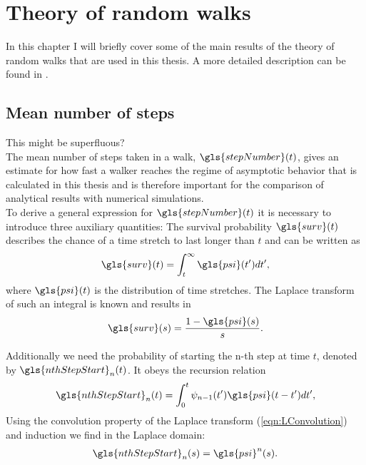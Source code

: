 \section{Theory of random walks} \label{sec:theory}
 
In this chapter I will briefly cover some of the main results of the theory of random walks that are used in this thesis. A more detailed description can be found in \cite{firstSteps}.



\subsection{Mean number of steps}

{\color{red} This might be superfluous?}\\
The mean number of steps taken in a walk, $\gls{stepNumber}(t)$, gives an estimate for how fast a walker reaches the regime of asymptotic behavior that is calculated in this thesis and is therefore important for the comparison of analytical results with numerical simulations.\\
To derive a general expression for $\gls{stepNumber}(t)$ it is necessary to introduce three auxiliary quantities: The survival probability $\gls{surv}(t)$ describes the chance of a time stretch to last longer than $t$ and can be written as
%
\begin{align}
\gls{surv}(t) = \int_{t}^{\infty} \gls{psi}(t') dt' ,
\end{align}
%
where $\gls{psi}(t)$ is the distribution of time stretches. The Laplace transform of such an integral is known and results in 
%
\begin{align}
\gls{surv}(s) = \frac{1-\gls{psi}(s)}{s} \label{eqn:surv}.
\end{align}

Additionally we need the probability of starting the n-th step at time $t$, denoted by $\gls{nthStepStart}_{n}(t)$. It obeys the recursion relation
%
\begin{align}
\gls{nthStepStart}_{n}(t) = \int_{0}^{t} \psi_{n-1}(t') \gls{psi}(t-t') dt' ,
\end{align}
%
Using the convolution property of the Laplace transform (\ref{eqn:LConvolution}) and induction we find in the Laplace domain:
%
\begin{align}
\gls{nthStepStart}_n(s) = \gls{psi}^{n}(s) \label{eqn:nthStepStart}.
\end{align}

